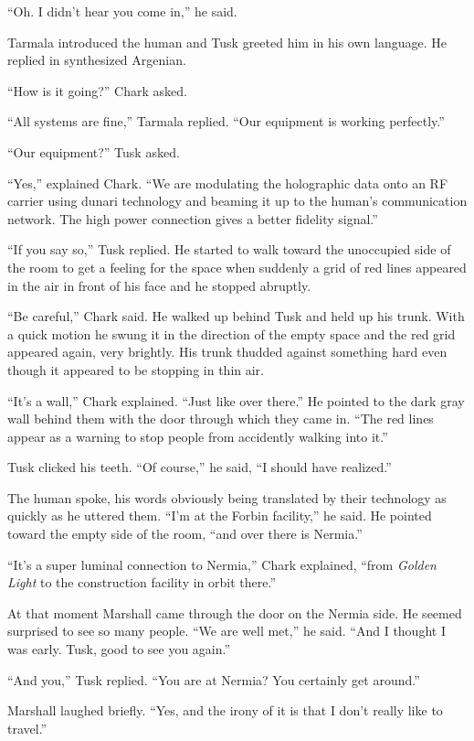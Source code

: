 ``Oh. I didn't hear you come in,'' he said.

Tarmala introduced the human and Tusk greeted him in his own language. He replied in synthesized
Argenian.

``How is it going?'' Chark asked.

``All systems are fine,'' Tarmala replied. ``Our equipment is working perfectly.''

``Our equipment?'' Tusk asked.

``Yes,'' explained Chark. ``We are modulating the holographic data onto an RF carrier using
dunari technology and beaming it up to the human's communication network. The high power
connection gives a better fidelity signal.''

``If you say so,'' Tusk replied. He started to walk toward the unoccupied side of the room to
get a feeling for the space when suddenly a grid of red lines appeared in the air in front of
his face and he stopped abruptly.

``Be careful,'' Chark said. He walked up behind Tusk and held up his trunk. With a quick motion
he swung it in the direction of the empty space and the red grid appeared again, very brightly.
His trunk thudded against something hard even though it appeared to be stopping in thin air.

``It's a wall,'' Chark explained. ``Just like over there.'' He pointed to the dark gray wall
behind them with the door through which they came in. ``The red lines appear as a warning to
stop people from accidently walking into it.''

Tusk clicked his teeth. ``Of course,'' he said, ``I should have realized.''

The human spoke, his words obviously being translated by their technology as quickly as he
uttered them. ``I'm at the Forbin facility,'' he said. He pointed toward the empty side of the
room, ``and over there is Nermia.''

``It's a super luminal connection to Nermia,'' Chark explained, ``from \textit{Golden Light} to
the construction facility in orbit there.''

At that moment Marshall came through the door on the Nermia side. He seemed surprised to see so
many people. ``We are well met,'' he said. ``And I thought I was early. Tusk, good to see you
again.''

``And you,'' Tusk replied. ``You are at Nermia? You certainly get around.''

Marshall laughed briefly. ``Yes, and the irony of it is that I don't really like to travel.''

